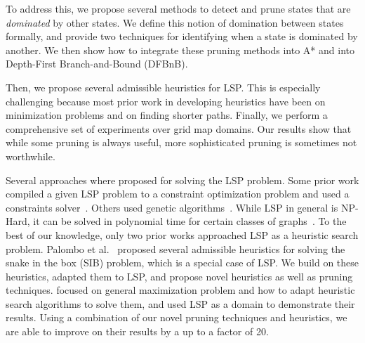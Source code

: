 \documentclass[letterpaper]{article} %
\newcommand{\inlinecite}[1]{\citeauthor{#1} \shortcite{#1}}
\begin{document}
To address this, we propose several methods to detect and prune states that are \emph{dominated} by other states. We define this notion of domination between states formally, and provide two techniques for identifying when a state is dominated by another. We then show how to integrate these pruning methods into A* and into Depth-First Branch-and-Bound (DFBnB).

Then, we propose several admissible heuristics for LSP. This is especially challenging because most prior work in developing heuristics have been on minimization problems and on finding shorter paths. Finally, we perform a comprehensive set of experiments over grid map domains. Our results show that while some pruning is always useful, more sophisticated pruning is sometimes not worthwhile.

Several approaches where proposed for solving the LSP problem.
Some prior work compiled a given LSP problem to a constraint optimization problem and used a constraints solver~\cite{DBLP:conf/cpaior/PhamD12}. Others used genetic algorithms~\cite{DBLP:conf/smc/PortugalAR10}. While LSP in general is NP-Hard, it can be solved in polynomial time for certain classes of graphs~\cite{KeshavarzKohjerdi2012ALA}.
To the best of our knowledge, only two prior works approached LSP as a heuristic search problem. Palombo et al.~ proposed several admissible heuristics for solving the snake in the box (SIB) problem, which is a special case of LSP. We build on these heuristics, adapted them to LSP, and propose novel heuristics as well as pruning techniques.
\inlinecite{DBLP:conf/socs/SternKPFR14} focused on general maximization problem and how to adapt heuristic search algorithms to solve them, and used LSP as a domain to demonstrate their results. Using a combination of our novel pruning techniques and heuristics, we are able to improve on their results by a up to a factor of 20.








\end{document}
